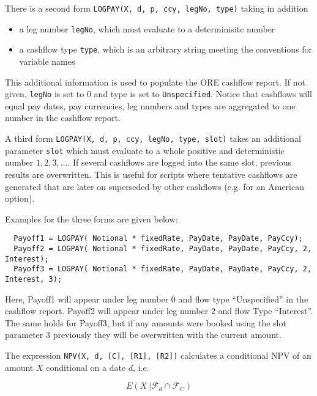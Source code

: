 There is a second form {\tt LOGPAY(X, d, p, ccy, legNo, type)} taking in addition

\begin{itemize}
\item a leg number \verb+legNo+, which must evaluate to a determinisitc number
\item a cashflow type \verb+type+, which is an arbitrary string meeting the conventions for variable names
\end{itemize}

This additional information is used to populate the ORE cashflow report. If not given, \verb+legNo+ is set to $0$ and
type is set to \verb+Unspecified+. Notice that cashflows will equal pay dates, pay currencies, leg numbers and types are
aggregated to one number in the cashflow report.

A third form {\tt LOGPAY(X, d, p, ccy, legNo, type, slot)} takes an additional parameter \verb+slot+ which must evaluate
to a whole positive and deterministic number $1,2,3,\ldots$. If several cashflows are logged into the same slot,
previous results are overwritten. This is useful for scripts where tentative cashflows are generated that are later on
superseded by other cashflows (e.g. for an American option).

Examples for the three forms are given below:

\begin{verbatim}
  Payoff1 = LOGPAY( Notional * fixedRate, PayDate, PayDate, PayCcy);
  Payoff2 = LOGPAY( Notional * fixedRate, PayDate, PayDate, PayCcy, 2, Interest);
  Payoff3 = LOGPAY( Notional * fixedRate, PayDate, PayDate, PayCcy, 2, Interest, 3);
\end{verbatim}

Here, Payoff1 will appear under leg number $0$ and flow type ``Unspecified'' in the cashflow report. Payoff2 will appear
under leg number $2$ and flow Type ``Interest''. The same holds for Payoff3, but if any amounts were booked using the
slot parameter $3$ previously they will be overwritten with the current amount.

\label{function_npv}

The expression {\tt NPV(X, d, [C], [R1], [R2])} calculates a conditional NPV of an amount $X$ conditional on a date $d$, i.e.

\begin{equation}\label{condexp}
  E( X\: | \mathcal{F}_d \cap \mathcal{F}_C )
\end{equation}

